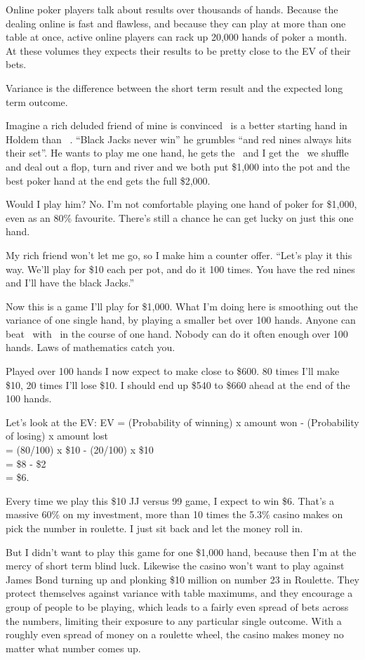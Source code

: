 Online poker players talk about results over thousands of hands. Because the
dealing online is fast and flawless, and because they can play at
more than one table at once, active online players can rack up
20,000 hands of poker a month. At these volumes they expects their
results to be pretty close to the EV of their bets.

Variance is the difference between the short term result and the
expected long term outcome.

Imagine a rich deluded friend of mine is convinced \nineh\nined\ is a better
starting hand in Holdem than \Jc\Js\ . ``Black Jacks never win'' he grumbles
``and red nines always hits their set''. He wants to play me one hand, he
gets the \nineh\nined\ and I get the \Jc\Js\, we shuffle and deal out a flop,
turn and river and we both put \$1,000 into the pot and the best
poker hand at the end gets the full \$2,000.

Would I play him? No. I'm not comfortable playing one hand of poker
for \$1,000, even as an 80\% favourite. There's still a chance he can get
lucky on just this one hand.

My rich friend won't let me go, so I make him a counter offer.
``Let's play it this way. We'll play for \$10 each per pot, and do
it 100 times. You have the red nines and I'll have the black Jacks.''

Now this is a game I'll play for \$1,000. What I'm doing here is smoothing
out the variance of one single hand, by playing a smaller bet over
100 hands. Anyone can beat \Jc\Js\ with \nineh\nined\ in the course of one
hand. Nobody can do it often enough over 100 hands. Laws of mathematics
catch you.

Played over 100 hands I now expect to make close to \$600. 80 times I'll
make \$10, 20 times I'll lose \$10. I should end up \$540 to \$660 ahead
at the end of the 100 hands.

Let's look at the EV:
EV = (Probability of winning) x amount won - (Probability of losing) x
amount lost \\
   = (80/100) x \$10 - (20/100) x \$10 \\
   = \$8 - \$2 \\
   = \$6.

Every time we play this \$10 JJ versus 99 game, I expect to win \$6. That's a
massive 60\% on my investment, more than 10 times the 5.3\% casino makes on
pick the number in roulette. I just sit back and let the money roll in.

But I didn't want to play this game for one \$1,000 hand, because then
I'm at the mercy of short term blind luck. Likewise the casino won't
want to play against James Bond turning up and plonking \$10 million
on number 23 in Roulette. They protect themselves against variance
with table maximums, and they encourage a group of people to be playing,
which leads to a fairly even spread of bets across the numbers, limiting
their exposure to any particular single outcome. With a roughly even spread
of money on a roulette wheel, the casino makes money no matter what
number comes up.


